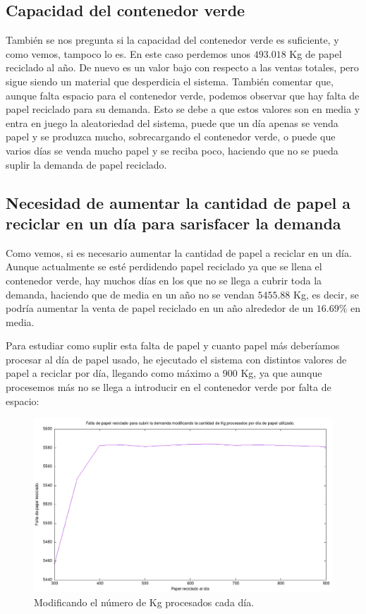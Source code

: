 \documentclass[12pt, spanish]{article}
\begin{document}
\subsection{Capacidad del contenedor verde}

También se nos pregunta si la capacidad del contenedor verde es suficiente, y como vemos, tampoco lo es. En este caso perdemos unos $493.018$ Kg de papel reciclado al año. De nuevo es un valor bajo con respecto a las ventas totales, pero sigue siendo un material que desperdicia el sistema. También comentar que, aunque falta espacio para el contenedor verde, podemos observar que hay falta de papel reciclado para su demanda. Esto se debe a que estos valores son en media y entra en juego la aleatoriedad del sistema, puede que un día apenas se venda papel y se produzca mucho, sobrecargando el contenedor verde, o puede que varios días se venda mucho papel y se reciba poco, haciendo que no se pueda suplir la demanda de papel reciclado.

\subsection{Necesidad de aumentar la cantidad de papel a reciclar en un día para sarisfacer la demanda}

Como vemos, si es necesario aumentar la cantidad de papel a reciclar en un día. Aunque actualmente se esté perdidendo papel reciclado ya que se llena el contenedor verde, hay muchos días en los que no se llega a cubrir toda la demanda, haciendo que de media en un año no se vendan $5455.88$ Kg, es decir, se podría aumentar la venta de papel reciclado en un año alrededor de un $16.69\%$ en media.

Para estudiar como suplir esta falta de papel y cuanto papel más deberíamos procesar al día de papel usado, he ejecutado el sistema con distintos valores de papel a reciclar por día, llegando como máximo a 900 Kg, ya que aunque procesemos más no se llega a introducir en el contenedor verde por falta de espacio:

\begin{figure}[H]
  \centering
   \includegraphics[width=\textwidth]{falta_papel_cambiando_kg_procesados.png}
	\caption{Modificando el número de Kg procesados cada día.}
\end{figure}
\end{document}
